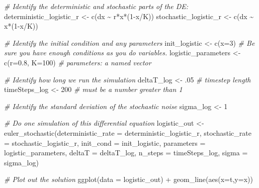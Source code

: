 \documentclass[
]{book}
\newenvironment{Shaded}{\begin{snugshade}}{\end{snugshade}}
\newcommand{\AttributeTok}[1]{\textcolor[rgb]{0.77,0.63,0.00}{#1}}
\newcommand{\CommentTok}[1]{\textcolor[rgb]{0.56,0.35,0.01}{\textit{#1}}}
\newcommand{\DecValTok}[1]{\textcolor[rgb]{0.00,0.00,0.81}{#1}}
\newcommand{\FloatTok}[1]{\textcolor[rgb]{0.00,0.00,0.81}{#1}}
\newcommand{\FunctionTok}[1]{\textcolor[rgb]{0.00,0.00,0.00}{#1}}
\newcommand{\NormalTok}[1]{#1}
\newcommand{\OtherTok}[1]{\textcolor[rgb]{0.56,0.35,0.01}{#1}}
\newcommand{\SpecialCharTok}[1]{\textcolor[rgb]{0.00,0.00,0.00}{#1}}
\theoremstyle{definition}
\theoremstyle{definition}
\theoremstyle{definition}
\theoremstyle{remark}
\begin{document}
\begin{Shaded}
\begin{Highlighting}[]
\CommentTok{\# Identify the deterministic and stochastic parts of the DE:}
\NormalTok{deterministic\_logistic\_r }\OtherTok{\textless{}{-}} \FunctionTok{c}\NormalTok{(dx }\SpecialCharTok{\textasciitilde{}}\NormalTok{ r}\SpecialCharTok{*}\NormalTok{x}\SpecialCharTok{*}\NormalTok{(}\DecValTok{1}\SpecialCharTok{{-}}\NormalTok{x}\SpecialCharTok{/}\NormalTok{K))}
\NormalTok{stochastic\_logistic\_r }\OtherTok{\textless{}{-}}  \FunctionTok{c}\NormalTok{(dx }\SpecialCharTok{\textasciitilde{}}\NormalTok{ x}\SpecialCharTok{*}\NormalTok{(}\DecValTok{1}\SpecialCharTok{{-}}\NormalTok{x}\SpecialCharTok{/}\NormalTok{K))}

\CommentTok{\# Identify the initial condition and any parameters}
\NormalTok{init\_logistic }\OtherTok{\textless{}{-}} \FunctionTok{c}\NormalTok{(}\AttributeTok{x=}\DecValTok{3}\NormalTok{)  }\CommentTok{\# Be sure you have enough conditions as you do variables. }
\NormalTok{logistic\_parameters }\OtherTok{\textless{}{-}} \FunctionTok{c}\NormalTok{(}\AttributeTok{r=}\FloatTok{0.8}\NormalTok{, }\AttributeTok{K=}\DecValTok{100}\NormalTok{)   }\CommentTok{\# parameters: a named vector}

\CommentTok{\# Identify how long we run the simulation}
\NormalTok{deltaT\_log }\OtherTok{\textless{}{-}}\NormalTok{ .}\DecValTok{05}    \CommentTok{\# timestep length}
\NormalTok{timeSteps\_log }\OtherTok{\textless{}{-}} \DecValTok{200}   \CommentTok{\# must be a number greater than 1}

\CommentTok{\# Identify the standard deviation of the stochastic noise}
\NormalTok{sigma\_log }\OtherTok{\textless{}{-}} \DecValTok{1}

\CommentTok{\# Do one simulation of this differential equation}
\NormalTok{logistic\_out }\OtherTok{\textless{}{-}} \FunctionTok{euler\_stochastic}\NormalTok{(}\AttributeTok{deterministic\_rate =}\NormalTok{ deterministic\_logistic\_r,}
                             \AttributeTok{stochastic\_rate =}\NormalTok{ stochastic\_logistic\_r,}
                             \AttributeTok{init\_cond =}\NormalTok{ init\_logistic,}
                             \AttributeTok{parameters =}\NormalTok{ logistic\_parameters,}
                             \AttributeTok{deltaT =}\NormalTok{ deltaT\_log,}
                             \AttributeTok{n\_steps =}\NormalTok{ timeSteps\_log,}
                             \AttributeTok{sigma =}\NormalTok{ sigma\_log)}

\CommentTok{\# Plot out the solution}
\FunctionTok{ggplot}\NormalTok{(}\AttributeTok{data =}\NormalTok{ logistic\_out) }\SpecialCharTok{+}
  \FunctionTok{geom\_line}\NormalTok{(}\FunctionTok{aes}\NormalTok{(}\AttributeTok{x=}\NormalTok{t,}\AttributeTok{y=}\NormalTok{x))}
\end{Highlighting}
\end{Shaded}
\end{document}
